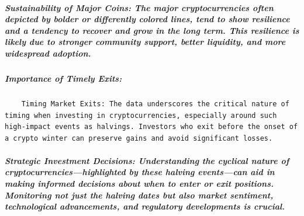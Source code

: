 \documentclass[
]{article}
\begin{document}
\hypertarget{sustainability-of-major-coins-the-major-cryptocurrencies-often-depicted-by-bolder-or-differently-colored-lines-tend-to-show-resilience-and-a-tendency-to-recover-and-grow-in-the-long-term.-this-resilience-is-likely-due-to-stronger-community-support-better-liquidity-and-more-widespread-adoption.}{%
\subparagraph{Sustainability of Major Coins: The major cryptocurrencies
often depicted by bolder or differently colored lines, tend to show
resilience and a tendency to recover and grow in the long term. This
resilience is likely due to stronger community support, better
liquidity, and more widespread
adoption.}\label{sustainability-of-major-coins-the-major-cryptocurrencies-often-depicted-by-bolder-or-differently-colored-lines-tend-to-show-resilience-and-a-tendency-to-recover-and-grow-in-the-long-term.-this-resilience-is-likely-due-to-stronger-community-support-better-liquidity-and-more-widespread-adoption.}}

\hypertarget{importance-of-timely-exits}{%
\subparagraph{Importance of Timely
Exits:}\label{importance-of-timely-exits}}

\begin{verbatim}
    Timing Market Exits: The data underscores the critical nature of timing when investing in cryptocurrencies, especially around such high-impact events as halvings. Investors who exit before the onset of a crypto winter can preserve gains and avoid significant losses.
\end{verbatim}

\hypertarget{strategic-investment-decisions-understanding-the-cyclical-nature-of-cryptocurrencieshighlighted-by-these-halving-eventscan-aid-in-making-informed-decisions-about-when-to-enter-or-exit-positions.-monitoring-not-just-the-halving-dates-but-also-market-sentiment-technological-advancements-and-regulatory-developments-is-crucial.}{%
\subparagraph{Strategic Investment Decisions: Understanding the cyclical
nature of cryptocurrencies---highlighted by these halving events---can
aid in making informed decisions about when to enter or exit positions.
Monitoring not just the halving dates but also market sentiment,
technological advancements, and regulatory developments is
crucial.}\label{strategic-investment-decisions-understanding-the-cyclical-nature-of-cryptocurrencieshighlighted-by-these-halving-eventscan-aid-in-making-informed-decisions-about-when-to-enter-or-exit-positions.-monitoring-not-just-the-halving-dates-but-also-market-sentiment-technological-advancements-and-regulatory-developments-is-crucial.}}
\end{document}

